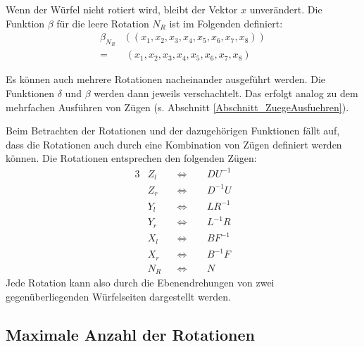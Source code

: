 \documentclass[12pt,a4paper, usenames, dvipsnames]{article}
\theoremstyle{mystyle}
\theoremstyle{definition}
\begin{document}
Wenn der Würfel nicht rotiert wird, bleibt der Vektor $x$ unverändert. Die Funktion $\beta$ für die leere Rotation $N_R$ ist im Folgenden definiert:
\begin{align*}
\beta_{N_R}  &  \left( (x_1, x_2, x_3, x_4, x_5,x_6,x_7,x_8) \right) \\
=  & \ (x_1, x_2, x_3, x_4, x_5,x_6,x_7,x_8)
\end{align*}

Es können auch mehrere Rotationen nacheinander ausgeführt werden. Die Funktionen $\delta$ und $\beta$ werden dann jeweils verschachtelt. Das erfolgt analog zu dem mehrfachen Ausführen von Zügen (s. Abschnitt \ref{Abschnitt_ZuegeAusfuehren}).

Beim Betrachten der Rotationen und der dazugehörigen Funktionen fällt auf, dass die Rotationen auch durch eine Kombination von Zügen definiert werden können. Die Rotationen entsprechen den folgenden Zügen:
\begin{alignat*}{3}
& Z_l && \Leftrightarrow \ \ &&  D U^{-1} \\
& Z_r && \Leftrightarrow &&  D^{-1} U \\
& Y_l && \Leftrightarrow && L R^{-1} \\
& Y_r && \Leftrightarrow && L^{-1} R  \\
& X_l && \Leftrightarrow && B F^{-1} \\
& X_r && \Leftrightarrow && B^{-1} F  \\
& N_R && \Leftrightarrow && N 
\end{alignat*}
Jede Rotation kann also durch die Ebenendrehungen von zwei gegenüberliegenden Würfelseiten dargestellt werden.



%
%
%
%
%
%
%
%
%
%
%
%
%
%
%
%
%
%
%

\subsection{Maximale Anzahl der Rotationen}
\label{Abschnitt_MaxAnzahlRotationen}
\end{document}
